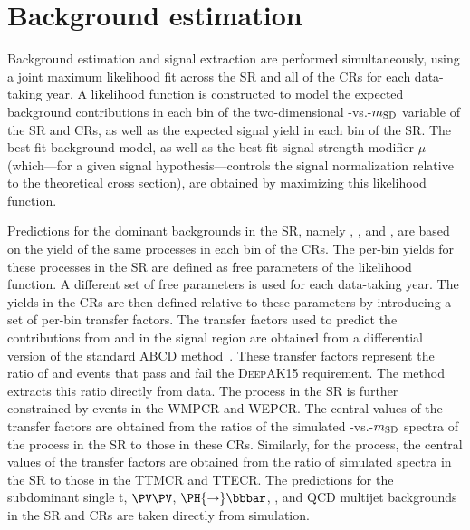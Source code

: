 \section{Background estimation}

Background estimation and signal extraction are performed simultaneously, using a joint maximum likelihood fit across the SR and all of the CRs for each data-taking year. A likelihood function is constructed to model the expected background contributions in each bin of the two-dimensional \recoil-vs.-$m_{\mathrm{SD}}$ variable of the SR and CRs, as well as the expected signal yield in each bin of the SR\@. The best fit background model, as well as the best fit signal strength modifier $\mu$ (which---for a given signal hypothesis---controls the signal normalization relative to the theoretical cross section), are obtained by maximizing this likelihood function.


Predictions for the dominant backgrounds 
in the SR, namely \Zjets, \Wjets, and \ttbar, 
are based on the yield of the same processes in each bin of the CRs. The per-bin yields for these processes in the SR are defined as free parameters of the likelihood function. A different set of free parameters is used for each data-taking year. The yields in the CRs are then defined relative to these parameters by introducing a set of per-bin transfer factors.
The transfer factors used to predict the contributions from \Wjets and \Zjets in the signal region are obtained from a differential version of the standard ABCD method~\cite{CMS:2024ddc}. These transfer factors represent the ratio of \PZ and \Wjets events that pass and fail the \textsc{DeepAK15} requirement. The method extracts this ratio directly from data. The \Wjets process in the SR is further constrained by \Wjets events in the WMPCR and WEPCR. The central values of the transfer factors are obtained from the ratios of the simulated \recoil-vs.-$m_{\mathrm{SD}}$ spectra of the \Wjets process in the SR to those in these CRs. Similarly, for the \ttbar process, the central values of the transfer factors are obtained from the ratio of simulated spectra in the SR to those in the TTMCR and TTECR.
The predictions for the subdominant single t, $\PV\PV$, $\PH {\to} \bbbar$, \DYjets, and QCD multijet backgrounds in the SR and CRs are taken directly from simulation.


